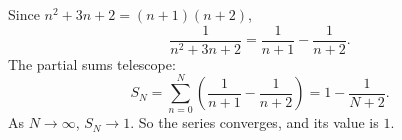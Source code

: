 Since \(n^2+3n+2=(n+1)(n+2)\),
\[
\dfrac{1}{n^2+3n+2}=\dfrac{1}{n+1}-\dfrac{1}{n+2}.
\]
The partial sums telescope:
\[
S_N=\sum_{n=0}^{N}\left(\dfrac{1}{n+1}-\dfrac{1}{n+2}\right)=1-\dfrac{1}{N+2}.
\]
As \(N\to\infty\), \(S_N\to1\). So the series converges, and its value is \(\boxed{1}\).
